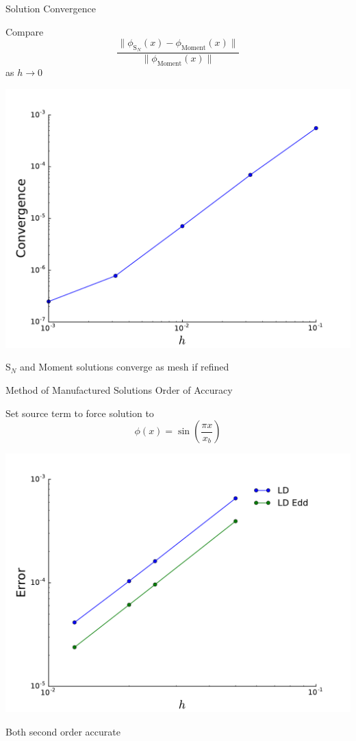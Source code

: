 \documentclass[10pt]{beamer}
\newcommand{\SN}{S$_N$\xspace}
\begin{document}
\begin{frame}{Solution Convergence}

	\onslide<+->
	Compare 
	\begin{equation*}
		\frac{\| \phi_{\text{S}_N}(x) - 
			\phi_\text{Moment}(x)\|}{\|\phi_\text{Moment}(x) \|}
	\end{equation*}
	as $h\rightarrow 0$ 

	\onslide<+->
	\centerline{\includegraphics[width=.5\paperwidth]{figs/hlim.pdf}}

	\onslide<+->
	\SN and Moment solutions converge as mesh if refined 

\end{frame}

\begin{frame}{Method of Manufactured Solutions Order of Accuracy} 

	Set source term to force solution to 
	\begin{equation*}
		\phi(x) = \sin\left(\frac{\pi x}{x_b}\right)
	\end{equation*}

	\pause
	\centerline{\includegraphics[width=.5\paperwidth]{figs/ooa.pdf}}

	\pause
	Both second order accurate

\end{frame}
\end{document}

